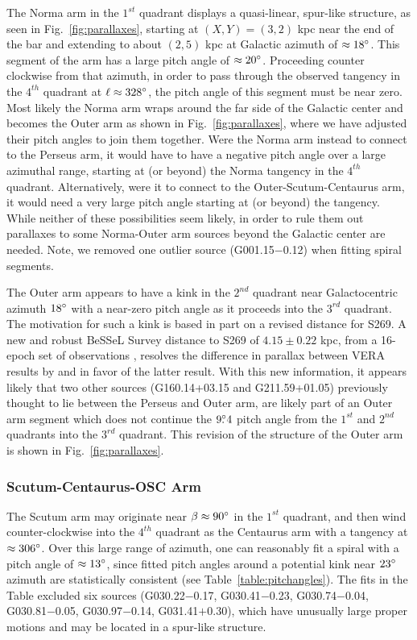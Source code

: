 \documentclass[12pt,preprint]{aastex}
\def\deg  {\ifmmode {^\circ}\else {$^\circ$}\fi}
\def\d    {\ifmmode {{\rlap{.}}^\circ}\else {${\rlap{.}}^\circ$}\fi}
\begin{document}
The Norma arm in the $1^{st}$ quadrant displays a quasi-linear, spur-like structure, 
as seen in Fig.~\ref{fig:parallaxes}, starting at $(X,Y) = (3,2)$ kpc near the end 
of the bar and extending to about $(2,5)$ kpc at Galactic azimuth of $\approx18\deg$.
This segment of the arm has a large pitch angle of $\approx20\deg$.  Proceeding counter 
clockwise from that azimuth, in order to pass through the observed tangency in the $4^{th}$ 
quadrant at $\ell\approx328\deg$, the pitch angle of this segment must be near zero.  
Most likely the Norma arm wraps around the far side of
the Galactic center and becomes the Outer arm as shown in Fig.~\ref{fig:parallaxes},
where we have adjusted their pitch angles to join them together.   
Were the Norma arm instead to connect to the Perseus arm, it would have to have a 
negative pitch angle over a large azimuthal range, starting at (or beyond) the Norma tangency 
in the $4^{th}$ quadrant.   
Alternatively, were it to connect to the Outer-Scutum-Centaurus arm, it would need a very 
large pitch angle starting at (or beyond) the tangency.  While neither of these 
possibilities seem likely, in order to rule them out parallaxes to some Norma-Outer 
arm sources beyond the Galactic center are needed.  Note, we removed one outlier source 
(G001.15$-$0.12) when fitting spiral segments.


The Outer arm appears to have a kink in the $2^{nd}$ quadrant near Galactocentric 
azimuth $18\deg$ with a near-zero pitch angle as it proceeds into the $3^{rd}$ quadrant. 
The motivation for such a kink is based in part on a revised distance for S269.  
A new and robust BeSSeL Survey distance to S269 of $4.15\pm0.22$ kpc, from a 16-epoch 
set of observations \citep{Nunez:19}, resolves the difference in parallax between 
VERA results by \citet{Honma:07} and \citet{Asaki14} in favor of the latter result.    
With this new information, it appears likely that two other sources 
(G160.14+03.15 and G211.59+01.05)
previously thought to lie between the Perseus and Outer arm, are likely part of an 
Outer arm segment which does not continue the $9\d4$ pitch angle from the 
$1^{st}$ and $2^{nd}$ quadrants into the $3^{rd}$ quadrant.  This revision of the 
structure of the Outer arm is shown in Fig.~\ref{fig:parallaxes}.

\subsubsection{Scutum-Centaurus-OSC Arm}\label{sect:OSC}

The Scutum arm may originate near $\beta\approx90\deg$ in the $1^{st}$ quadrant,
and then wind counter-clockwise into the $4^{th}$ quadrant as the Centaurus arm
with a tangency at $\approx306\deg$.  Over this large range of azimuth, one can
reasonably fit a spiral with a pitch angle of $\approx13\deg$, since fitted
pitch angles around a potential kink near $23\deg$ azimuth are statistically
consistent (see Table~\ref{table:pitchangles}).  The fits in the Table excluded six sources 
(G030.22$-$0.17, G030.41$-$0.23, G030.74$-$0.04, G030.81$-$0.05, G030.97$-$0.14, G031.41$+$0.30),
which have unusually large proper motions \citep{Immer18} and may be located in
a spur-like structure.
\end{document}
